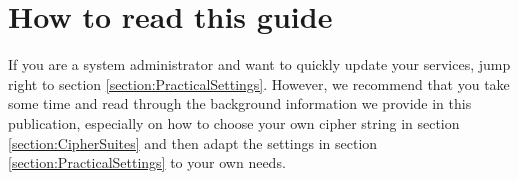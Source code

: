 \section{How to read this guide}

If you are a system administrator and want to quickly update your services, jump right to section \ref{section:PracticalSettings}. However, we recommend that you take some time and read through the background information we provide in this publication, especially on how to choose your own cipher string in section \ref{section:CipherSuites} and then adapt the settings in section \ref{section:PracticalSettings} to your own needs.


